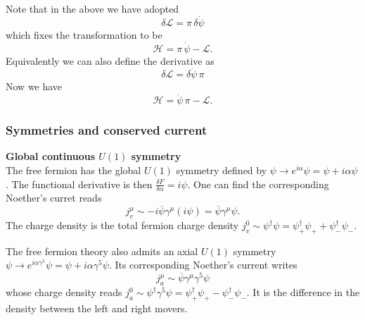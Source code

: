 \documentclass[submission, PhysLectNotes]{SciPost}
\begin{document}
Note that in the above we have adopted
\begin{equation}
	\delta \mathcal{L} = \pi\,\delta \dot{\psi}
\end{equation}
which fixes the transformation to be 
\begin{equation}
	\mathcal{H} = \pi \,\dot{\psi} - \mathcal{L}.
\end{equation}
Equivalently we can also define the derivative as
\begin{equation}
	\delta \mathcal{L} = \delta \dot{\psi} \,\pi
\end{equation}
Now we have 
\begin{equation}
	\mathcal{H} = \dot{\psi} \, \pi - \mathcal{L}.
\end{equation}

\subsubsection*{Symmetries and conserved current}
{\bf Global continuous $U(1)$ symmetry}\\
The free fermion has the global $U(1)$ symmetry defined by $\psi \rightarrow e^{i\alpha}\psi = \psi + i\alpha \psi$. The functional derivative is then $\frac{\delta F}{\delta \alpha} = i\psi$. One can find the corresponding Noether's curret reads
\begin{equation}
	j_v^\mu \sim -i\overline{\psi} \gamma^\mu \left(i\psi\right) = \overline{\psi} \gamma^\mu \psi.
\end{equation}
The charge density is the total fermion charge density $j_v^0 \sim \psi^\dagger \psi = \psi_{+}^\dagger\psi_{+} + \psi_{-}^\dagger\psi_{-}$.

The free fermion theory also admits an axial $U(1)$ symmetry $\psi \rightarrow e^{i\alpha \gamma^5} \psi = \psi + i\alpha \gamma^5 \psi$. Its corresponding Noether's current writes
\begin{equation}
	j_a^\mu \sim \overline{\psi} \gamma^\mu\gamma^5 \psi
\end{equation}
whose charge density reads $j^0_a \sim \psi^\dagger \gamma^5 \psi = \psi_{+}^\dagger \psi_{+} - \psi_{-}^\dagger \psi_{-}$. It is the difference in the density between the left and right movers.
\end{document}
